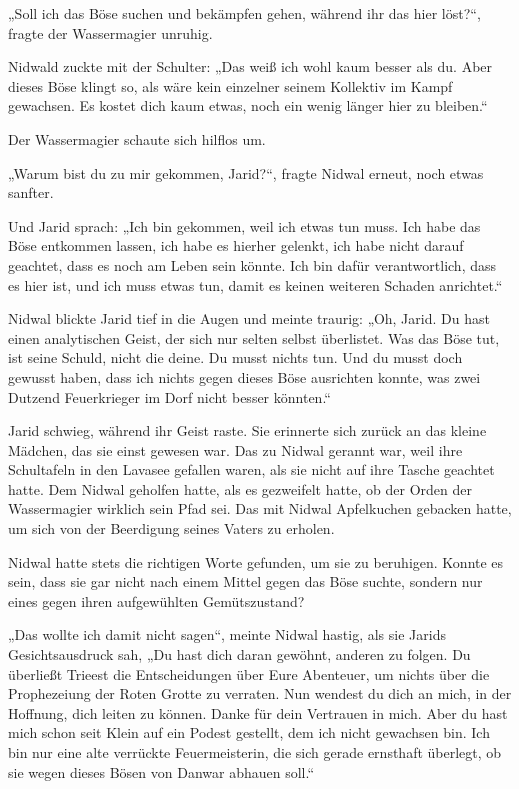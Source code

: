 „Soll ich das Böse suchen und bekämpfen gehen, während ihr das hier löst?“, fragte der Wassermagier unruhig.

Nidwald zuckte mit der Schulter: „Das weiß ich wohl kaum besser als du. Aber dieses Böse klingt so, als wäre kein einzelner seinem Kollektiv im Kampf gewachsen. Es kostet dich kaum etwas, noch ein wenig länger hier zu bleiben.“

Der Wassermagier schaute sich hilflos um.

„Warum bist du zu mir gekommen, Jarid?“, fragte Nidwal erneut, noch etwas sanfter.

Und Jarid sprach: „Ich bin gekommen, weil ich etwas tun muss. Ich habe das Böse entkommen lassen, ich habe es hierher gelenkt, ich habe nicht darauf geachtet, dass es noch am Leben sein könnte. Ich bin dafür verantwortlich, dass es hier ist, und ich muss etwas tun, damit es keinen weiteren Schaden anrichtet.“

Nidwal blickte Jarid tief in die Augen und meinte traurig: „Oh, Jarid. Du hast einen analytischen Geist, der sich nur selten selbst überlistet. Was das Böse tut, ist seine Schuld, nicht die deine. Du musst nichts tun. Und du musst doch gewusst haben, dass ich nichts gegen dieses Böse ausrichten konnte, was zwei Dutzend Feuerkrieger im Dorf nicht besser könnten.“

Jarid schwieg, während ihr Geist raste. Sie erinnerte sich zurück an das kleine Mädchen, das sie einst gewesen war. Das zu Nidwal gerannt war, weil ihre Schultafeln in den Lavasee gefallen waren, als sie nicht auf ihre Tasche geachtet hatte. Dem Nidwal geholfen hatte, als es gezweifelt hatte, ob der Orden der Wassermagier wirklich sein Pfad sei. Das mit Nidwal Apfelkuchen gebacken hatte, um sich von der Beerdigung seines Vaters zu erholen.

Nidwal hatte stets die richtigen Worte gefunden, um sie zu beruhigen. Konnte es sein, dass sie gar nicht nach einem Mittel gegen das Böse suchte, sondern nur eines gegen ihren aufgewühlten Gemütszustand?

„Das wollte ich damit nicht sagen“, meinte Nidwal hastig, als sie Jarids Gesichtsausdruck sah, „Du hast dich daran gewöhnt, anderen zu folgen. Du überließt Trieest die Entscheidungen über Eure Abenteuer, um nichts über die Prophezeiung der Roten Grotte zu verraten. Nun wendest du dich an mich, in der Hoffnung, dich leiten zu können. Danke für dein Vertrauen in mich. Aber du hast mich schon seit Klein auf ein Podest gestellt, dem ich nicht gewachsen bin. Ich bin nur eine alte verrückte Feuermeisterin, die sich gerade ernsthaft überlegt, ob sie wegen dieses Bösen von Danwar abhauen soll.“

